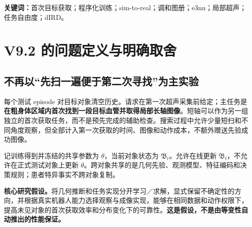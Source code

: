 \documentclass[UTF8,fontset=fandol,11pt,a4paper]{ctexart}
\theoremstyle{plain}
\theoremstyle{definition}
\theoremstyle{remark}
\numberwithin{equation}{section}
\newcommand{\B}{\mathfrak B}
\begin{document}
\begin{abstract}
V9.2 将研究目标从跨检查请求的历史复用，改为\emph{合成训练后对未见对象的首次目标获取}。机器人从外部身体估计与粗解剖区域开始，不拥有该对象的内部中心线、已成功切面或全局声窗模型。局部超声经标定与概率关联提升为身体锚定的分型状态，e3nn 学习有限计算预算下的几何后验提议；同一状态评价短搜索动作及候选成像实现。V6.1 的后验任务自由度成为关键执行机制：一旦形成可用局部目标假设，机器人可协同改变接触位置与姿态，而不固守一条预生成 TCP 轨迹；变形幅度由当前几何不确定性与最终动作风险限制，dIRD 提议有利的实际实现，连续 IK 与控制约束独立验收。搜索阶段不强制尚不可满足的居中／标准切面约束，避免一开始便拒绝所有动作。理论给出已知坐标变化的消除、任务相关观察与各向异性风险之间的关系、选择后的风险边界以及跨域条件误差的适用范围。首轮在既有 DMP\_playground 上新增隔离的首次获取基准，分别检验无真值泄漏、程序化训练的组合泛化、主动观察的决策价值和真实关节执行。最终 sim-to-real 目标采用同一冻结推断与决策模型、固定真实前端和新对象在线推断；几何仿真结果不被称为真人迁移。方案不要求大量医生示教、完整器官恢复、材料辨识或新的 Diffusion 策略。
\end{abstract}
\noindent\textbf{关键词：}首次目标获取；程序化训练；sim-to-real；调和图册；e3nn；局部超声；任务自由度；dIRD。
\setcounter{tocdepth}{1}\begingroup\small\setlength{\parskip}{0pt}\tableofcontents\endgroup\clearpage

\section{V9.2 的问题定义与明确取舍}
\subsection{不再以“先扫一遍便于第二次寻找”为主实验}
每个测试 episode 对目标对象清空历史。请求在第一次超声采集前给定；主任务是\textbf{在粗身体区域内首次找到一段目标血管并取得局部长轴图像}。短轴可以作为另一组独立的首次获取任务，而不是预先完成的辅助检查。搜索过程中允许少量短扫和不同角度观察，但全部计入第一次获取的时间、图像和动作成本，不额外赠送先验成功图像。

记训练得到并冻结的共享参数为 $\theta$，当前对象状态为 $\B_t$。允许在线更新 $\B_t$，不允许在正式测试对象上更新 $\theta$。跨对象共享的是几何先验、观测模型、特征编码和决策规则；患者特异事实不跨对象复制。

\begin{corebox}
\textbf{核心研究假设。}将几何推断和任务实现分开学习／求解，显式保留不确定性的方向，并根据真实机器人能力选择观察与成像实现，能够在相同数据和动作权限下，提高未见对象的首次获取效率和分布变化下的可靠性。\textbf{这是假设，不是由等变性自动推出的性能保证。}
\end{corebox}
\end{document}
